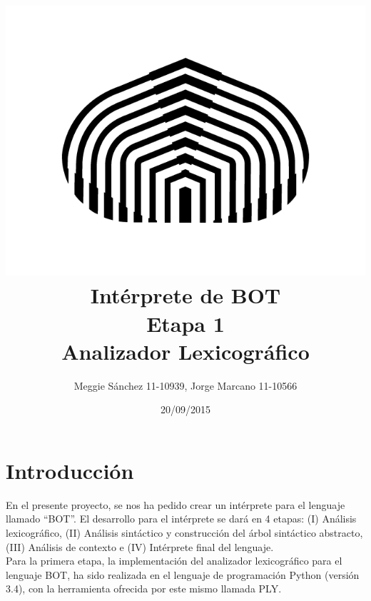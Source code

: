 \documentclass{article}
\title{}
\author{}
\date{}
\begin{document}
\vspace{1.5cm}
 
\title{ \includegraphics[scale=0.3]{usb}  \\ Intérprete de BOT \\ Etapa 1 \\ Analizador Lexicográfico }

\author{Meggie Sánchez 11-10939, Jorge Marcano 11-10566} 

\date{20/09/2015}

\maketitle

\newpage

\section{Introducción}
\hspace{0.5cm} 	En el presente proyecto, se nos ha pedido crear un intérprete para el lenguaje llamado “BOT”. El desarrollo para el intérprete se dará en 4 etapas: (I) Análisis lexicográfico, (II) Análisis sintáctico y construcción del árbol sintáctico abstracto, (III) Análisis de contexto e (IV) Intérprete final del lenguaje. \\

\hspace{0.5cm} Para la primera etapa, la implementación del analizador lexicográfico para el lenguaje BOT, ha sido realizada en el lenguaje de programación Python (versión 3.4), con la herramienta ofrecida por este mismo llamada PLY. 
\end{document}
